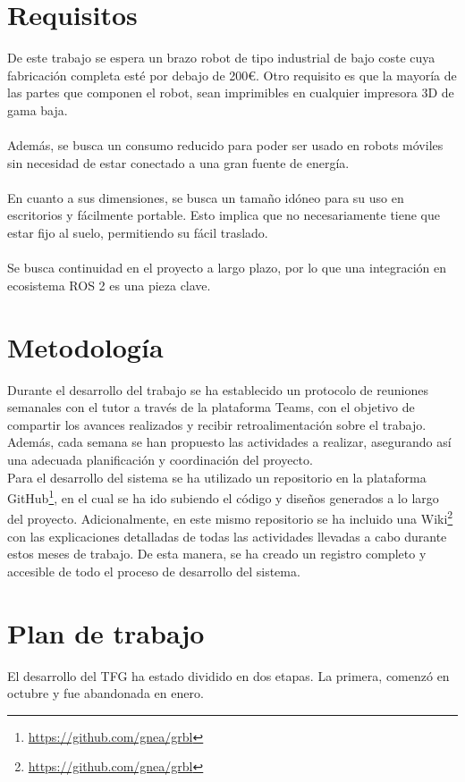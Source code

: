 \section{Requisitos}
\label{sec:requisitos}
De este trabajo se espera un brazo robot de tipo industrial de bajo coste cuya fabricación completa esté por debajo de 200\euro.
Otro requisito es que la mayoría de las partes que componen el robot, sean imprimibles en cualquier impresora 3D de gama baja.\\\\
Además, se busca un consumo reducido para poder ser usado en robots móviles sin necesidad de estar conectado a una gran fuente de 
energía.\\\\
En cuanto a sus dimensiones, se busca un tamaño idóneo para su uso en escritorios y fácilmente portable. Esto implica que no necesariamente 
tiene que estar fijo al suelo, permitiendo su fácil traslado.\\\\
Se busca continuidad en el proyecto a largo plazo, por lo que una integración en ecosistema ROS 2 es una pieza clave. 

\section{Metodología}
\label{sec:metodologia}

Durante el desarrollo del trabajo se ha establecido un protocolo de reuniones semanales con el tutor a 
través de la plataforma Teams, con el objetivo de compartir los avances realizados y recibir retroalimentación 
sobre el trabajo. Además, cada semana se han propuesto las actividades a realizar, asegurando así una adecuada 
planificación y coordinación del proyecto. \\
Para el desarrollo del sistema se ha utilizado un repositorio en la plataforma GitHub\footnote{\url{https://github.com/gnea/grbl}}, en el cual se ha ido
subiendo el código y diseños generados a lo largo del proyecto. Adicionalmente, en este mismo repositorio 
se ha incluido una Wiki\footnote{\url{https://github.com/gnea/grbl}} con las explicaciones detalladas de todas las actividades llevadas a cabo durante estos 
meses de trabajo. De esta manera, se ha creado un registro completo y accesible de todo el proceso de desarrollo del sistema.

\section{Plan de trabajo}
\label{sec:plantrabajo}
El desarrollo del TFG ha estado dividido en dos etapas. La primera, comenzó en octubre y fue abandonada en enero. 